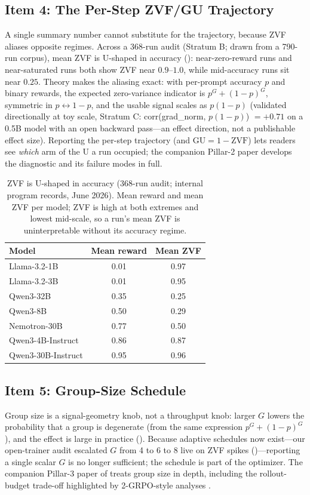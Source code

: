 \subsection{Item 4: The Per-Step ZVF/GU Trajectory}
\label{sec:p5-item4}
A single summary number cannot substitute for the trajectory, because ZVF
aliases opposite regimes. Across a 368-run audit (Stratum B; drawn from a
790-run corpus), mean ZVF is U-shaped in accuracy ():
near-zero-reward runs and near-saturated runs both show ZVF near $0.9$--$1.0$,
while mid-accuracy runs sit near $0.25$. Theory makes the aliasing exact: with
per-prompt accuracy $p$ and binary rewards, the expected zero-variance
indicator is $p^G + (1-p)^G$, symmetric in $p \leftrightarrow 1-p$, and the
usable signal scales as $p(1-p)$ (validated directionally at toy scale,
Stratum C: corr(grad\_norm, $p(1-p)$) $= +0.71$ on a 0.5B model with an open
backward pass---an effect direction, not a publishable effect size). Reporting
the per-step trajectory (and $\mathrm{GU} = 1 - \mathrm{ZVF}$) lets readers
see \emph{which} arm of the U a run occupied; the companion Pillar-2 paper
develops the diagnostic and its failure modes in full.

\begin{table}[t]
\centering
\caption{ZVF is U-shaped in accuracy (368-run audit; internal program
records, June 2026). Mean reward and mean ZVF per model; ZVF is high at both
extremes and lowest mid-scale, so a run's mean ZVF is uninterpretable without
its accuracy regime.}
\label{tab:p5-ushape}
\small
\begin{tabular}{@{}lcc@{}}
\toprule
Model & Mean reward & Mean ZVF \\
\midrule
Llama-3.2-1B        & 0.01 & 0.97 \\
Llama-3.2-3B        & 0.01 & 0.95 \\
Qwen3-32B           & 0.35 & 0.25 \\
Qwen3-8B            & 0.50 & 0.29 \\
Nemotron-30B        & 0.77 & 0.50 \\
Qwen3-4B-Instruct   & 0.86 & 0.87 \\
Qwen3-30B-Instruct  & 0.95 & 0.96 \\
\bottomrule
\end{tabular}
\end{table}

\subsection{Item 5: Group-Size Schedule}
\label{sec:p5-item5}
Group size is a signal-geometry knob, not a throughput knob: larger $G$ lowers
the probability that a group is degenerate (from the same expression
$p^G + (1-p)^G$), and the effect is large in practice
(). Because adaptive schedules now exist---our
open-trainer audit escalated $G$ from 4 to 6 to 8 live on ZVF spikes
()---reporting a single scalar $G$ is no longer
sufficient; the schedule is part of the optimizer. The companion Pillar-3
paper of \ours{} treats group size in depth, including the rollout-budget
trade-off highlighted by 2-GRPO-style analyses \citep{wu2025grpo_dpo,
tan2025scalingrl}.

